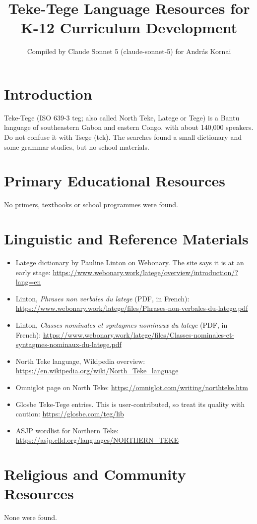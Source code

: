 \documentclass[12pt]{article}
\title{Teke-Tege Language Resources for K-12 Curriculum Development}
\author{Compiled by Claude Sonnet 5 (claude-sonnet-5) for Andr\'as Kornai}
\date{}
\begin{document}
\maketitle

\section{Introduction}
Teke-Tege (ISO 639-3 teg; also called North Teke, Latege or Tege) is a Bantu language of southeastern Gabon and eastern Congo, with about 140,000 speakers. Do not confuse it with Tsege (tck). The searches found a small dictionary and some grammar studies, but no school materials.

\section{Primary Educational Resources}
No primers, textbooks or school programmes were found.

\section{Linguistic and Reference Materials}
\begin{itemize}
\item Latege dictionary by Pauline Linton on Webonary. The site says it is at an early stage: \url{https://www.webonary.work/latege/overview/introduction/?lang=en}
\item Linton, \emph{Phrases non verbales du latege} (PDF, in French): \url{https://www.webonary.work/latege/files/Phrases-non-verbales-du-latege.pdf}
\item Linton, \emph{Classes nominales et syntagmes nominaux du latege} (PDF, in French): \url{https://www.webonary.work/latege/files/Classes-nominales-et-syntagmes-nominaux-du-latege.pdf}
\item North Teke language, Wikipedia overview: \url{https://en.wikipedia.org/wiki/North_Teke_language}
\item Omniglot page on North Teke: \url{https://omniglot.com/writing/northteke.htm}
\item Glosbe Teke-Tege entries. This is user-contributed, so treat its quality with caution: \url{https://glosbe.com/teg/lib}
\item ASJP wordlist for Northern Teke: \url{https://asjp.clld.org/languages/NORTHERN_TEKE}
\end{itemize}

\section{Religious and Community Resources}
None were found.
\end{document}
